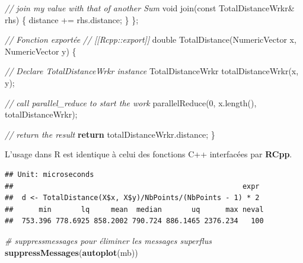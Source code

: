 \documentclass[
  12pt,
  french,
  a4paper,
  extrafontsizes,onecolumn,openright
  ]{memoir}
\newenvironment{Shaded}{\begin{snugshade}}{\end{snugshade}}
\newcommand{\AttributeTok}[1]{\textcolor[rgb]{0.77,0.63,0.00}{#1}}
\newcommand{\CommentTok}[1]{\textcolor[rgb]{0.56,0.35,0.01}{\textit{#1}}}
\newcommand{\ControlFlowTok}[1]{\textcolor[rgb]{0.13,0.29,0.53}{\textbf{#1}}}
\newcommand{\DataTypeTok}[1]{\textcolor[rgb]{0.13,0.29,0.53}{#1}}
\newcommand{\DecValTok}[1]{\textcolor[rgb]{0.00,0.00,0.81}{#1}}
\newcommand{\KeywordTok}[1]{\textcolor[rgb]{0.13,0.29,0.53}{\textbf{#1}}}
\newcommand{\NormalTok}[1]{#1}
\newcommand{\OperatorTok}[1]{\textcolor[rgb]{0.81,0.36,0.00}{\textbf{#1}}}
\newcommand{\StringTok}[1]{\textcolor[rgb]{0.31,0.60,0.02}{#1}}
\newlength{\rf}
\begin{document}
\begin{Shaded}
\begin{Highlighting}[]
  \CommentTok{// join my value with that of another Sum}
  \DataTypeTok{void}\NormalTok{ join(}\AttributeTok{const}\NormalTok{ TotalDistanceWrkr& rhs) \{ }
\NormalTok{    distance += rhs.distance; }
\NormalTok{  \}}
\NormalTok{\};}


\CommentTok{// Fonction exportée}
\CommentTok{// [[Rcpp::export]]}
\DataTypeTok{double}\NormalTok{ TotalDistance(NumericVector x, NumericVector y) \{}
  
  \CommentTok{// Declare TotalDistanceWrkr instance}
\NormalTok{  TotalDistanceWrkr totalDistanceWrkr(x, y);}
  
  \CommentTok{// call parallel_reduce to start the work}
\NormalTok{  parallelReduce(}\DecValTok{0}\NormalTok{, x.length(), totalDistanceWrkr);}
  
  \CommentTok{// return the result}
  \ControlFlowTok{return}\NormalTok{ totalDistanceWrkr.distance;}
\NormalTok{\}}
\end{Highlighting}
\end{Shaded}

\normalsize

L'usage dans R est identique à celui des fonctions C++ interfacées par \textbf{RCpp}.

\scriptsize

\begin{Shaded}
\end{Shaded}

\begin{verbatim}
## Unit: microseconds
##                                                      expr
##  d <- TotalDistance(X$x, X$y)/NbPoints/(NbPoints - 1) * 2
##      min       lq     mean  median       uq      max neval
##  753.396 778.6925 858.2002 790.724 886.1465 2376.234   100
\end{verbatim}

\begin{Shaded}
\begin{Highlighting}[]
\CommentTok{# suppressmessages pour éliminer les messages superflus}
\KeywordTok{suppressMessages}\NormalTok{(}\KeywordTok{autoplot}\NormalTok{(mb))}
\end{Highlighting}
\end{Shaded}
\end{document}
